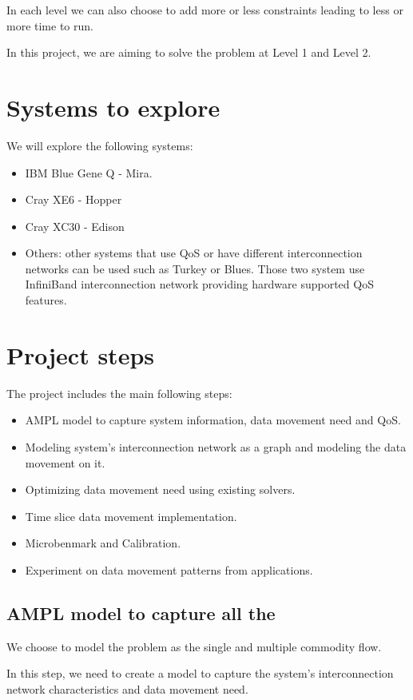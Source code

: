 \documentclass[letter]{article}
\begin{document}
In each level we can also choose to add more or less constraints leading to less or more time to run.

In this project, we are aiming to solve the problem at Level 1 and Level 2.

\section {Systems to explore}
We will explore the following systems: 
\begin{itemize}
\item IBM Blue Gene Q - Mira.
\item Cray XE6 - Hopper
\item Cray XC30 - Edison
\item Others: other systems that use QoS or have different interconnection networks can be used such as Turkey or Blues. Those two system use InfiniBand interconnection network providing hardware supported QoS features.
\end{itemize}

\section{Project steps}

The project includes the main following steps:
\begin{itemize}
\item AMPL model to capture system information, data movement need and QoS.
\item Modeling system's interconnection network as a graph and modeling the data movement on it.
\item Optimizing data movement need using existing solvers.
\item Time slice data movement implementation.
\item Microbenmark and Calibration.
\item Experiment on data movement patterns from applications.
\end{itemize}

\subsection {AMPL model to capture all the }
We choose to model the problem as the single and multiple commodity flow.

In this step, we need to create a model to capture the system's interconnection network characteristics and data movement need. 
\end{document}
